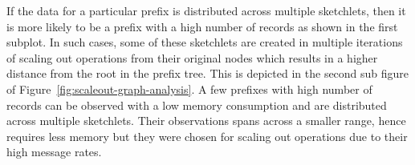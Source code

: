 If the data for a particular prefix is distributed across multiple sketchlets, then it is more likely to be a prefix with a high number of records as shown in the first subplot.
In such cases, some of these sketchlets are created in multiple iterations of scaling out operations from their original nodes which results in a higher distance from the root in the prefix tree. This is depicted in the second sub figure of Figure~\ref{fig:scaleout-graph-analysis}.
A few prefixes with high number of records can be observed with a low memory consumption and are distributed across multiple sketchlets.
Their observations spans across a smaller range, hence requires less memory but they were chosen for scaling out operations due to their high message rates. 



